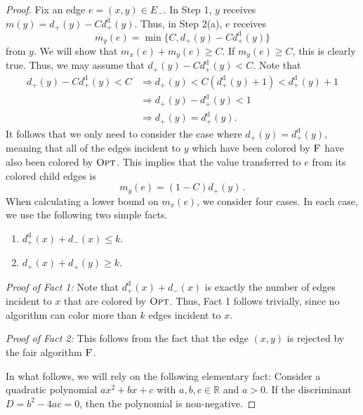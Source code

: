 \documentclass[smallextended]{svjour3}
\newcommand{\er}{\ensuremath{E_{-}}\xspace}
\def\dc{d_{+}}
\def\dd{d_{+}^{\text{d}}}
\def\dr{d_{-}}
\newcommand{\OPT}{\ensuremath{\operatorname{\textsc{Opt}}}\xspace}
\newcommand{\FAIR}{\ensuremath{\operatorname{\textsc{F}}}\xspace}
\begin{document}
\begin{proof}
Fix an edge $e=(x,y)\in \er$. 
In Step 1, $y$ receives $m(y) = \dc(y)-C\dd(y)$.
Thus, in Step 2(a), $e$ receives 
 $$m_y(e) = \min\{C,\dc(y)-C\dd(y)\}$$
from $y$.
We will show that $m_x(e)+m_y(e)\geq C$. 
If $m_y(e) \geq C$, this is clearly true.
Thus, we may assume that $\dc(y)-C\dd(y)<C$.
Note that
\begin{align*}
\dc(y)-C\dd(y)<C &\Rightarrow \dc(y)<C(\dd(y)+1)< \dd(y)+1\\
&\Rightarrow \dc(y)-\dd(y)<1\\
&\Rightarrow \dc(y)=\dd(y).
\end{align*}
It follows that we only need to consider the case where $\dc(y)=\dd(y)$, meaning that all of the edges incident to $y$ which have been colored by $\FAIR$ have also been colored by \OPT. This implies that the value transferred to $e$ from its colored child edges is  
 $$m_y(e) = (1-C)\dc(y)\,.$$ 
When calculating a lower bound on $m_x(e)$, we consider four cases.
In each case, we use the following two simple facts.

\begin{enumerate}[Fact 1:]
\item[Fact 1:] $\dd(x)+\dr(x) \leq k$.
\item[Fact 2:] $\dc(x)+\dc(y) \geq k$.
\end{enumerate}

{\em Proof of Fact 1:}
Note that $\dd(x)+\dr(x)$ is exactly the number of edges incident to $x$ that are colored by \OPT.
Thus, Fact 1 follows trivially, since no algorithm can color more than $k$ edges incident to $x$.

{\em Proof of Fact 2:}
This follows from the fact that the edge $(x,y)$ is rejected by the fair algorithm \FAIR.

In what follows, we will rely on the following elementary fact:
Consider a quadratic polynomial $ax^2+bx+c$ with $a,b,c \in \mathbb{R}$ and $a>0$.
If the discriminant $D = b^2-4ac = 0$, then the polynomial is non-negative.


\end{proof}
\end{document}
